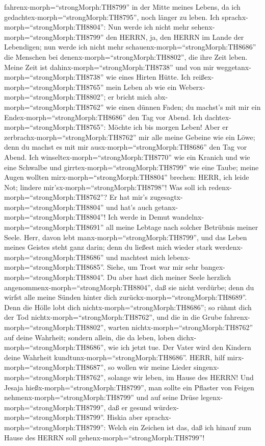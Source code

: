 fahrenx-morph=``strongMorph:TH8799'' in der Mitte meines Lebens, da ich
gedachtex-morph=``strongMorph:TH8795'', noch länger zu leben.
 Ich sprachx-morph=``strongMorph:TH8804'': Nun werde ich
nicht mehr sehenx-morph=``strongMorph:TH8799'' den HERRN, ja, den HERRN
im Lande der Lebendigen; nun werde ich nicht mehr
schauenx-morph=``strongMorph:TH8686'' die Menschen bei
denenx-morph=``strongMorph:TH8802'', die ihre Zeit leben. 
Meine Zeit ist dahinx-morph=``strongMorph:TH8738'' und von mir
weggetanx-morph=``strongMorph:TH8738'' wie eines Hirten Hütte. Ich
reißex-morph=``strongMorph:TH8765'' mein Leben ab wie ein
Weberx-morph=``strongMorph:TH8802''; er bricht mich
abx-morph=``strongMorph:TH8762'' wie einen dünnen Faden; du machst's mit
mir ein Endex-morph=``strongMorph:TH8686'' den Tag vor Abend.
 Ich dachtex-morph=``strongMorph:TH8765'': Möchte ich bis
morgen Leben! Aber er zerbrachx-morph=``strongMorph:TH8762'' mir alle
meine Gebeine wie ein Löwe; denn du machst es mit mir
ausx-morph=``strongMorph:TH8686'' den Tag vor Abend.  Ich
winseltex-morph=``strongMorph:TH8770'' wie ein Kranich und wie eine
Schwalbe und girrtex-morph=``strongMorph:TH8799'' wie eine Taube; meine
Augen wollten mirx-morph=``strongMorph:TH8804'' brechen: HERR, ich leide
Not; lindere mir'sx-morph=``strongMorph:TH8798''!  Was soll
ich redenx-morph=``strongMorph:TH8762''? Er hat mir's
zugesagtx-morph=``strongMorph:TH8804'' und hat's auch
getanx-morph=``strongMorph:TH8804''! Ich werde in Demut
wandelnx-morph=``strongMorph:TH8691'' all meine Lebtage nach solcher
Betrübnis meiner Seele.  Herr, davon lebt
manx-morph=``strongMorph:TH8799'', und das Leben meines Geistes steht
ganz darin; denn du ließest mich wieder stark
werdenx-morph=``strongMorph:TH8686'' und machtest mich
lebenx-morph=``strongMorph:TH8685''.  Siehe, um Trost war
mir sehr bangex-morph=``strongMorph:TH8804''. Du aber hast dich meiner
Seele herzlich angenommenx-morph=``strongMorph:TH8804'', daß sie nicht
verdürbe; denn du wirfst alle meine Sünden hinter dich
zurückx-morph=``strongMorph:TH8689''.  Denn die Hölle lobt
dich nichtx-morph=``strongMorph:TH8686''; so rühmt dich der Tod
nichtx-morph=``strongMorph:TH8762'', und die in die Grube
fahrenx-morph=``strongMorph:TH8802'', warten
nichtx-morph=``strongMorph:TH8762'' auf deine Wahrheit; 
sondern allein, die da leben, loben dichx-morph=``strongMorph:TH8686'',
wie ich jetzt tue. Der Vater wird den Kindern deine Wahrheit
kundtunx-morph=``strongMorph:TH8686''.  HERR, hilf
mirx-morph=``strongMorph:TH8687'', so wollen wir meine Lieder
singenx-morph=``strongMorph:TH8762'', solange wir leben, im Hause des
HERRN!  Und Jesaja hießx-morph=``strongMorph:TH8799'', man
sollte ein Pflaster von Feigen nehmenx-morph=``strongMorph:TH8799'' und
auf seine Drüse legenx-morph=``strongMorph:TH8799'', daß er gesund
würdex-morph=``strongMorph:TH8799''.  Hiskia aber
sprachx-morph=``strongMorph:TH8799'': Welch ein Zeichen ist das, daß ich
hinauf zum Hause des HERRN soll gehenx-morph=``strongMorph:TH8799''!

